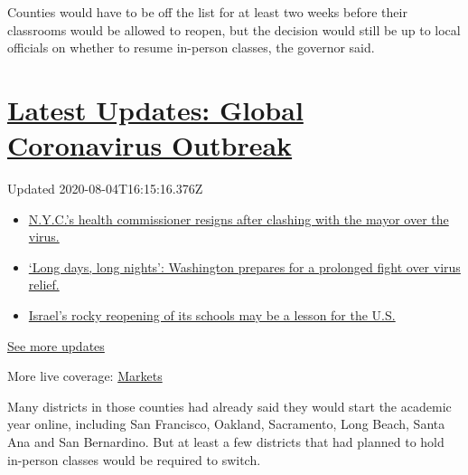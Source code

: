 Counties would have to be off the list for at least two weeks before
their classrooms would be allowed to reopen, but the decision would
still be up to local officials on whether to resume in-person classes,
the governor said.

\hypertarget{latest-updates-global-coronavirus-outbreak}{%
\section{\texorpdfstring{\href{https://www.nytimes.com/2020/08/04/world/coronavirus-covid-19.html?action=click\&pgtype=Article\&state=default\&region=MAIN_CONTENT_1\&context=storylines_live_updates}{Latest
Updates: Global Coronavirus
Outbreak}}{Latest Updates: Global Coronavirus Outbreak}}\label{latest-updates-global-coronavirus-outbreak}}

Updated 2020-08-04T16:15:16.376Z

\begin{itemize}
\tightlist
\item
  \href{https://www.nytimes.com/2020/08/04/world/coronavirus-covid-19.html?action=click\&pgtype=Article\&state=default\&region=MAIN_CONTENT_1\&context=storylines_live_updates\#link-4d1eafa8}{N.Y.C.'s
  health commissioner resigns after clashing with the mayor over the
  virus.}
\item
  \href{https://www.nytimes.com/2020/08/04/world/coronavirus-covid-19.html?action=click\&pgtype=Article\&state=default\&region=MAIN_CONTENT_1\&context=storylines_live_updates\#link-6b644638}{`Long
  days, long nights': Washington prepares for a prolonged fight over
  virus relief.}
\item
  \href{https://www.nytimes.com/2020/08/04/world/coronavirus-covid-19.html?action=click\&pgtype=Article\&state=default\&region=MAIN_CONTENT_1\&context=storylines_live_updates\#link-7af9fca0}{Israel's
  rocky reopening of its schools may be a lesson for the U.S.}
\end{itemize}

\href{https://www.nytimes.com/2020/08/04/world/coronavirus-covid-19.html?action=click\&pgtype=Article\&state=default\&region=MAIN_CONTENT_1\&context=storylines_live_updates}{See
more updates}

More live coverage:
\href{https://www.nytimes.com/live/2020/08/04/business/stock-market-today-coronavirus?action=click\&pgtype=Article\&state=default\&region=MAIN_CONTENT_1\&context=storylines_live_updates}{Markets}

Many districts in those counties had already said they would start the
academic year online, including San Francisco, Oakland, Sacramento, Long
Beach, Santa Ana and San Bernardino. But at least a few districts that
had planned to hold in-person classes would be required to switch.

